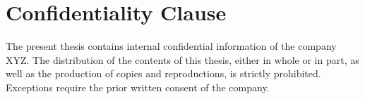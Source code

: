 \chapter*{Confidentiality Clause}
\label{confidentiality}

The present thesis contains internal confidential information of the company XYZ. The distribution of the contents of this thesis, either in whole or in part, as well as the production of copies and reproductions, is strictly prohibited. Exceptions require the prior written consent of the company.
